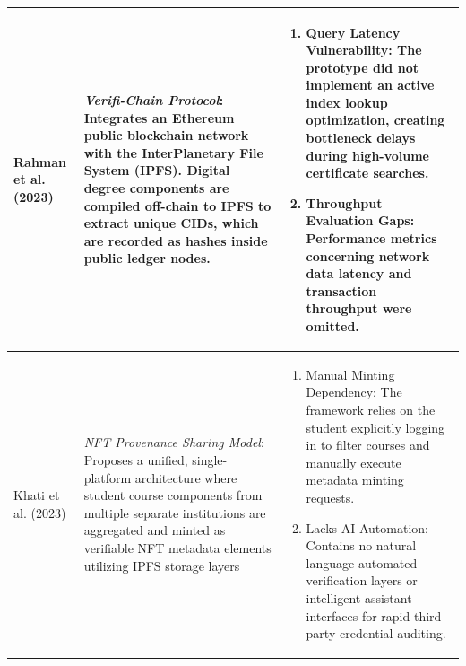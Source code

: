 \begin{longtable}{|m{3.5cm}|m{5cm}|m{5.5cm}|}
    Rahman et al. (2023) \cite{rahman2023verifichain}                                                                                                                                                                                                                      &
    \textit{Verifi-Chain Protocol}: Integrates an Ethereum public blockchain network with the InterPlanetary File System (IPFS). Digital degree components are compiled off-chain to IPFS to extract unique CIDs, which are recorded as hashes inside public ledger nodes. &
    \begin{enumerate}[nosep, leftmargin=*]
        \item Query Latency Vulnerability: The prototype did not implement an active index lookup optimization, creating bottleneck delays during high-volume certificate searches.
        \item Throughput Evaluation Gaps: Performance metrics concerning network data latency and transaction throughput were omitted.
    \end{enumerate}                                                                                               \\
    \hline

    Khati et al. (2023) \cite{khati2023studentcert}                                                                                                                                                                                                                        &
    \textit{NFT Provenance Sharing Model}: Proposes a unified, single-platform architecture where student course components from multiple separate institutions are aggregated and minted as verifiable NFT metadata elements utilizing IPFS storage layers                &
    \begin{enumerate}[nosep, leftmargin=*]
        \item Manual Minting Dependency: The framework relies on the student explicitly logging in to filter courses and manually execute metadata minting requests.
        \item Lacks AI Automation: Contains no natural language automated verification layers or intelligent assistant interfaces for rapid third-party credential auditing.
    \end{enumerate}                                                                                                      \\
    \hline


\end{longtable}
